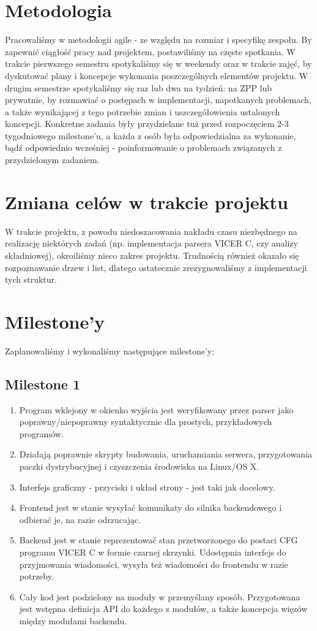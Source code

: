 \documentclass[a4paper,twoside,openright,11pt]{report}
\begin{document}
  \section {Metodologia}
\par Pracowaliśmy w metodologii agile - ze względu na rozmiar i specyfikę zespołu. By zapewnić ciągłość pracy nad projektem, postawiliśmy na częste spotkania. W trakcie pierwszego semestru spotykaliśmy się w weekendy oraz w trakcie zajęć, by dyskutować plany i koncepcje wykonania poszczególnych elementów projektu. W drugim semestrze spotykaliśmy się raz lub dwa na tydzień: na ZPP lub prywatnie, by rozmawiać o postępach w implementacji, napotkanych problemach, a także wynikającej z tego potrzebie zmian i uszczegółowienia ustalonych koncepcji. Konkretne zadania były przydzielane tuż przed rozpoczęciem 2-3 tygodniowego milestone’u, a każda z osób była odpowiedzialna za wykonanie, bądź odpowiednio wcześniej - poinformowanie o problemach związanych z przydzielonym zadaniem.

  \section {Zmiana celów w trakcie projektu}
\par W trakcie projektu, z powodu niedoszacowania nakładu czasu niezbędnego na realizację niektórych zadań (np. implementacja parsera VICER C, czy analizy składniowej), okroiliśmy nieco zakres projektu. Trudnością również okazało się rozpoznawanie drzew i list, dlatego ostatecznie zrezygnowaliśmy z implementacji tych struktur.
  \section {Milestone'y}
\par Zaplanowaliśmy i wykonaliśmy następujące milestone'y:
  \subsection {Milestone 1}
  \begin {enumerate}
    \item Program wklejony w okienko wyjścia jest weryfikowany przez parser jako poprawny/niepoprawny syntaktycznie dla prostych, przykładowych programów.
    \item Działają poprawnie skrypty budowania, uruchamiania serwera, przygotowania paczki dystrybucyjnej i czyszczenia środowiska na Linux/OS X.
    \item Interfejs graficzny - przyciski i układ strony - jest taki jak docelowy. 
    \item Frontend jest w stanie wysyłać komunikaty do silnika backendowego i odbierać je, na razie odrzucając.
    \item Backend jest w stanie reprezentować stan przetworzonego do postaci CFG programu VICER C w formie czarnej skrzynki. Udostępnia interfejs do przyjmowania wiadomości, wysyła też wiadomości do frontendu w razie potrzeby.
    \item Cały kod jest podzielony na moduły w przemyślany sposób.
Przygotowana jest wstępna definicja API do każdego z modułów, a także koncepcja więzów między modułami backendu.
  \end {enumerate}
\end{document}

